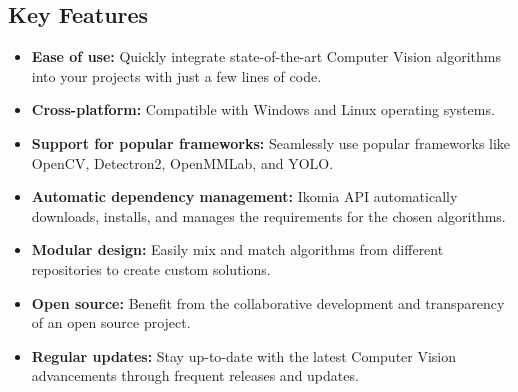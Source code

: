     \subsection{Key Features}
        \begin{itemize}
            \item \textbf{Ease of use:} Quickly integrate state-of-the-art Computer Vision algorithms into your projects with just a few lines of code.
            \item \textbf{Cross-platform:} Compatible with Windows and Linux operating systems.
            \item \textbf{Support for popular frameworks:} Seamlessly use popular frameworks like OpenCV, Detectron2, OpenMMLab, and YOLO.
            \item \textbf{Automatic dependency management:} Ikomia API automatically downloads, installs, and manages the requirements for the chosen algorithms.
            \item \textbf{Modular design:} Easily mix and match algorithms from different repositories to create custom solutions.
            \item \textbf{Open source:} Benefit from the collaborative development and transparency of an open source project.
            \item \textbf{Regular updates:} Stay up-to-date with the latest Computer Vision advancements through frequent releases and updates.
        \end{itemize}